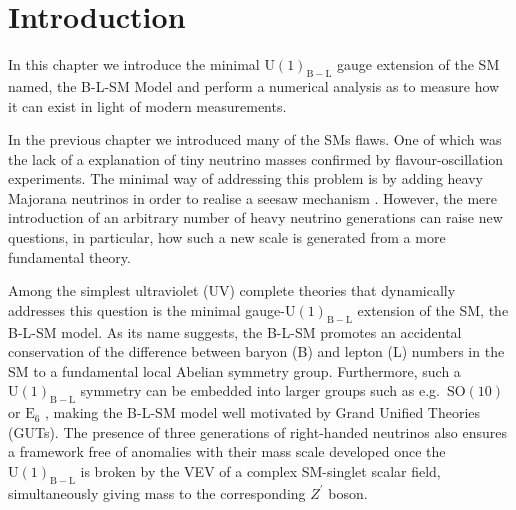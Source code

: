 \documentclass[10pt]{report}
\newcommand{\SO}[2]{\mathrm{SO}(#1)_{\mathrm{#2}}}		%
\newcommand{\E}[1]{\mathrm{E}_{#1}}	%
\newcommand{\U}[1]{\mathrm{U}(1)_{\mathrm{#1}}}
\begin{document}

\section{Introduction}
\label{sec:Introduction}

In this chapter we introduce the minimal $\U{B-L}$ gauge extension of the SM named, the B-L-SM Model  \cite{Basso:2011na} and perform a numerical analysis as to measure how it can exist in light of modern measurements. 

In the previous chapter we introduced many of the SMs flaws. 
%
One of which was the lack of a explanation of tiny neutrino masses confirmed by flavour-oscillation experiments. The minimal way of addressing this problem is by adding heavy Majorana neutrinos in order to realise a seesaw mechanism \cite{Mohapatra:1979ia}.
%
However, the mere introduction of an arbitrary number of heavy neutrino generations can raise new questions, in particular, how such a new scale is generated from a more fundamental theory. 

Among the simplest ultraviolet (UV) complete theories that dynamically addresses this question is the minimal gauge-$\U{B-L}$ extension of the SM, the B-L-SM model. 
%
As its name suggests, the B-L-SM promotes an accidental conservation of the difference between baryon (B) and lepton (L) numbers in the SM to a fundamental local Abelian symmetry group.
%
Furthermore, such a $\U{B-L}$ symmetry can be embedded into larger groups such as e.g.~$\SO{10}{}$ \cite{Chanowitz:1977ye} %
 or $\E{6}$ \cite{Achiman:1978vg}%
, making the B-L-SM model well motivated by Grand Unified Theories (GUTs).
%
The presence of three generations of right-handed neutrinos also ensures a framework free of anomalies with their mass scale developed once the $\U{B-L}$ is broken by the VEV of a complex SM-singlet scalar field, simultaneously giving mass to the corresponding $Z^\prime$ boson.
\end{document}
